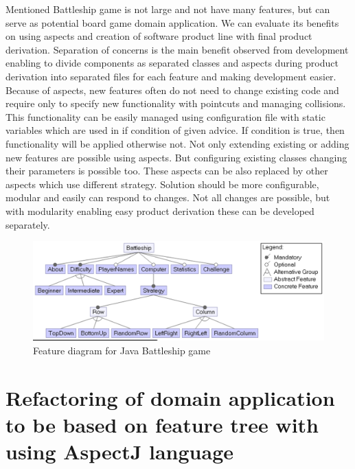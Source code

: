 \documentclass[11pt,slovak,a4paper,twoside]{article}
\begin{document}
Mentioned Battleship game is not large and not have many features, but can serve as potential board game domain application. We can evaluate its benefits on using aspects and creation of software product line with final product derivation. Separation of concerns is the main benefit observed from development enabling to divide components as separated classes and aspects during product derivation into separated files for each feature and making development easier. Because of aspects, new features often do not need to change existing code and require only to specify new functionality with pointcuts and managing collisions. This functionality can be easily managed using configuration file with static variables which are used in if condition of given advice. If condition is true, then functionality will be applied otherwise not. Not only extending existing or adding new features are possible using aspects. But configuring existing classes changing their parameters is possible too. These aspects can be also replaced by other aspects which use different strategy. Solution should be more configurable, modular and easily can respond to changes. Not all changes are possible, but with modularity enabling easy product derivation these can be developed separately.


\begin{figure}[t]  %
					\begin{center}
									\includegraphics[width=\linewidth]{fig/battleshipFeatureModel.png}
									\caption{Feature diagram for Java Battleship game}
									\label{battleshipFeatureModel}
					\end{center}
\end{figure}


\section{Refactoring of domain application to be based on feature tree with using AspectJ language} \label{gameRefactoring}
\end{document}
